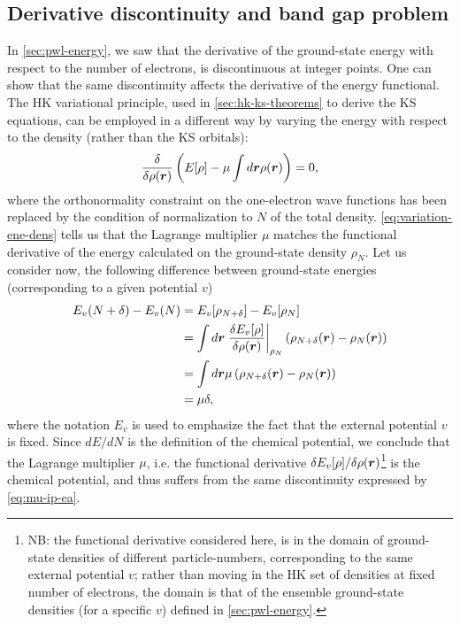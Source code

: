 \subsection{Derivative discontinuity and band gap problem\label{sec:deriv-dis}}
In \cref{sec:pwl-energy}, we saw that the derivative of the ground-state energy with respect to the number of electrons, is discontinuous at integer points. One can show that the same discontinuity affects the derivative of the energy functional. The HK variational principle, used in \cref{sec:hk-ks-theorems} to derive the KS equations, can be employed in a different way by varying the energy with respect to the density (rather than the KS orbitals):
%
\begin{equation}
    \frac{\delta}{\delta \rho({\bm r})}\left( E[\rho] - \mu \int d{\bm r} \rho({\bm r}) \right) = 0,
    \label{eq:variation-ene-dens}
\end{equation}
%
where the orthonormality constraint on the one-electron wave functions has been replaced by the condition of normalization to $N$ of the total density. \cref{eq:variation-ene-dens} tells us that the Lagrange multiplier $\mu$ matches the functional derivative of the energy calculated on the ground-state density $\rho_N$. Let us consider now, the following difference between ground-state energies (corresponding to a given potential $v$)
%
\begin{equation}
    \begin{split}
    E_v(N+\delta) - E_v(N) &= E_v[\rho_{N+\delta}] - E_v[\rho_{N}] \\
    &= \int d{\bm r} \left. \frac{\delta E_v[\rho]}{\delta \rho({\bm r})} \right|_{\rho_N} \left( \rho_{N+\delta}({\bm r}) - \rho_N({\bm r}) \right) \\
    &= \int d{\bm r} \mu \left( \rho_{N+\delta}({\bm r}) - \rho_N({\bm r}) \right) \\
    &= \mu \delta ,
    \end{split}
    \label{eq:mu-matching}
\end{equation}
%
where the notation $E_v$ is used to emphasize the fact that the external potential $v$ is fixed. Since $dE/dN$ is the definition of the chemical potential, we conclude that the Lagrange multiplier $\mu$, i.e. the functional derivative $\delta E_v[\rho]/\delta \rho({\bm r})$\footnote{NB: the functional derivative considered here, is in the domain of ground-state densities of different particle-numbers, corresponding to the same external potential $v$; rather than moving in the HK set of densities at fixed number of electrons, the domain is that of the ensemble ground-state densities (for a specific $v$) defined in \cref{sec:pwl-energy}.} is the chemical potential, and thus suffers from the same discontinuity expressed by \cref{eq:mu-ip-ea}.

